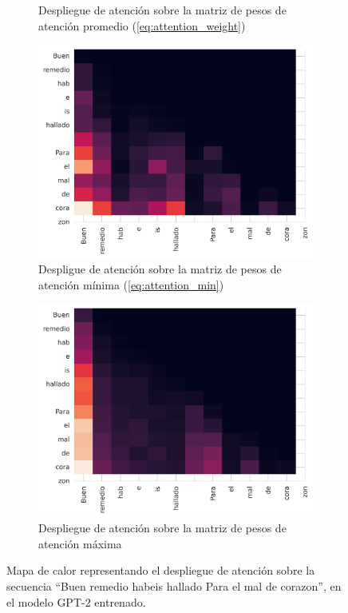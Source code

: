 \begin{figure}[tb]
\begin{subfigure}[b]{0.49\textwidth}
        \caption{Despliegue de atención sobre la matriz de pesos de atención promedio (\cref{eq:attention_weight})}
    \end{subfigure}
    \bigskip
    \begin{subfigure}[b]{0.49\textwidth}
        \centering
        \includegraphics[width=\textwidth]{figures/chapter5/rollout_min.png}
        \caption{Despligue de atención sobre la matriz de pesos de atención mínima (\cref{eq:attention_min})}
    \end{subfigure}
    \smallskip
    \begin{subfigure}[b]{0.49\textwidth}
        \centering
        \includegraphics[width=\textwidth]{figures/chapter5/rollout_max.png}
        \caption{Despliegue de atención sobre la matriz de pesos de atención máxima}
    \end{subfigure}

    \caption{Mapa de calor representando el despliegue de atención sobre la secuencia  ``Buen remedio habeis hallado Para el mal de corazon'', en el modelo GPT-2 entrenado.}
    \label{fig:attention_rollout}
\end{figure}



